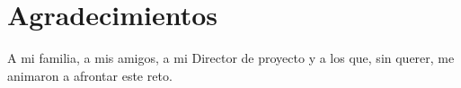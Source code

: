 
\chapter*{Agradecimientos}
\begin{center}
\thispagestyle{empty}
\par\end{center}

A mi familia, a mis amigos, a mi Director de proyecto y a los que, sin querer, me animaron a afrontar este reto.


